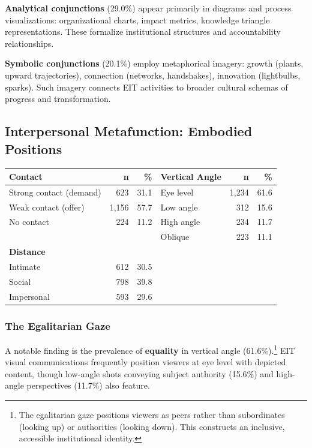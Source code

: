 \documentclass[../main.tex]{subfiles}
\begin{document}
\textbf{Analytical conjunctions} (29.0\%) appear primarily in diagrams and process visualizations: organizational charts, impact metrics, knowledge triangle representations. These formalize institutional structures and accountability relationships.

\textbf{Symbolic conjunctions} (20.1\%) employ metaphorical imagery: growth (plants, upward trajectories), connection (networks, handshakes), innovation (lightbulbs, sparks). Such imagery connects EIT activities to broader cultural schemas of progress and transformation.

\subsection{Interpersonal Metafunction: Embodied Positions}

\begin{center}
\small
\begin{tabular}{lrrlrr}
\toprule
\textbf{Contact} & \textbf{n} & \textbf{\%} & \textbf{Vertical Angle} & \textbf{n} & \textbf{\%} \\
\midrule
Strong contact (demand) & 623 & 31.1 & Eye level & 1,234 & 61.6 \\
Weak contact (offer) & 1,156 & 57.7 & Low angle & 312 & 15.6 \\
No contact & 224 & 11.2 & High angle & 234 & 11.7 \\
 & & & Oblique & 223 & 11.1 \\
\midrule
\textbf{Distance} & & & & & \\
\midrule
Intimate & 612 & 30.5 & & & \\
Social & 798 & 39.8 & & & \\
Impersonal & 593 & 29.6 & & & \\
\bottomrule
\end{tabular}
\end{center}

\subsubsection{The Egalitarian Gaze}

A notable finding is the prevalence of \textbf{equality} in vertical angle (61.6\%).\footnote{The egalitarian gaze positions viewers as peers rather than subordinates (looking up) or authorities (looking down). This constructs an inclusive, accessible institutional identity.} EIT visual communications frequently position viewers at eye level with depicted content, though low-angle shots conveying subject authority (15.6\%) and high-angle perspectives (11.7\%) also feature.
\end{document}
